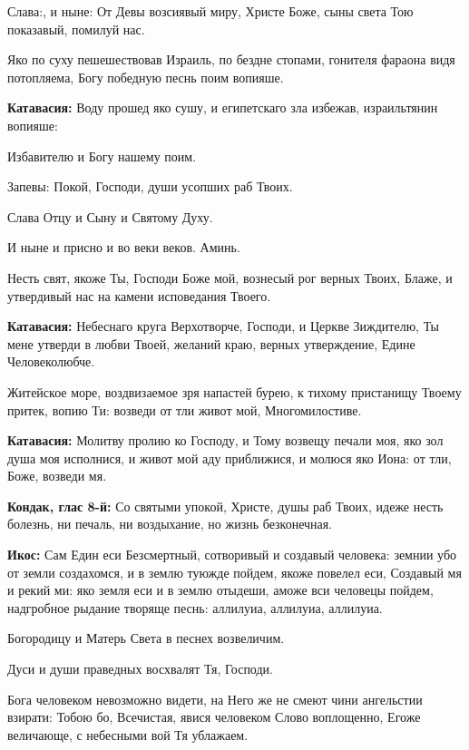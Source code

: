 \begin{mymulticols}
Слава:, и ныне: От Девы возсиявый миру, Христе Боже, сыны света Тою показавый, помилуй нас.




 Яко по суху пешешествовав Израиль, по бездне стопами, гонителя фараона видя потопляема, Богу победную песнь поим вопияше. 

{\bfseries Катавасия:} Воду прошед яко сушу, и египетскаго зла избежав, израильтянин вопияше: 

Избавителю и Богу нашему поим. 

Запевы: Покой, Господи, души усопших раб Твоих. 

Слава Отцу и Сыну и Святому Духу. 

И ныне и присно и во веки веков. Аминь.


 Несть свят, якоже Ты, Господи Боже мой, вознесый рог верных Твоих, Блаже, и утвердивый нас на камени исповедания Твоего. 

{\bfseries Катавасия:} Небеснаго круга Верхотворче, Господи, и Церкве Зиждителю, Ты мене утверди в любви Твоей, желаний краю, верных утверждение, Едине Человеколюбче. 

 Житейское море, воздвизаемое зря напастей бурею, к тихому пристанищу Твоему притек, вопию Ти: возведи от тли живот мой, Многомилостиве. 

{\bfseries Катавасия:} Молитву пролию ко Господу, и Тому возвещу печали моя, яко зол душа моя исполнися, и живот мой аду приближися, и молюся яко Иона: от тли, Боже, возведи мя. 

{\bfseries Кондак, глас 8-й:} Со святыми упокой, Христе, душы раб Твоих, идеже несть болезнь, ни печаль, ни воздыхание, но жизнь безконечная. 

{\bfseries Икос:} Сам Един еси Безсмертный, сотворивый и создавый человека: земнии убо от земли создахомся, и в землю туюжде пойдем, якоже повелел еси, Создавый мя и рекий ми: яко земля еси и в землю отыдеши, аможе вси человецы пойдем, надгробное рыдание творяще песнь: аллилуиа, аллилуиа, аллилуиа. 

 Богородицу и Матерь Света в песнех возвеличим. 

 Дуси и души праведных восхвалят Тя, Господи. 

 Бога человеком невозможно видети, на Него же не смеют чини ангельстии взирати: Тобою бо, Всечистая, явися человеком Слово воплощенно, Егоже величающе, с небесными вой Тя ублажаем. 


\end{mymulticols}

